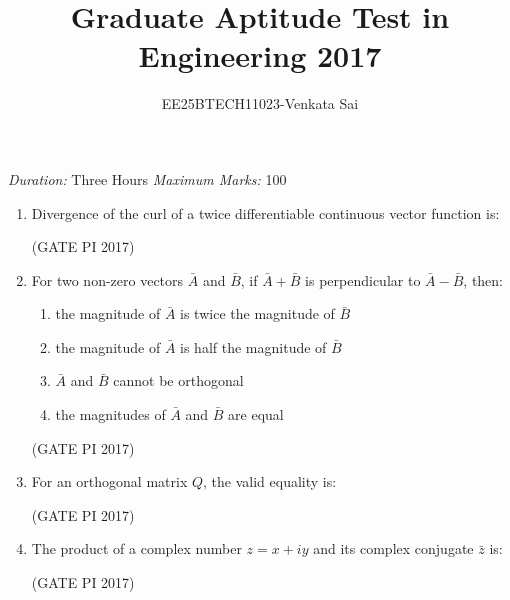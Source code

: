 \documentclass[journal,12pt,onecolumn]{IEEEtran}
\title{Graduate Aptitude Test in Engineering 2017}
\author{EE25BTECH11023-Venkata Sai}
\theoremstyle{remark}
\begin{document}
\noindent
\maketitle
\textit{Duration:} Three Hours \hfill \textit{Maximum Marks:} 100

\begin{enumerate}

\item Divergence of the curl of a twice differentiable continuous vector function is:
\begin{enumerate}
\end{enumerate}
\hfill (GATE PI 2017)

\item For two non-zero vectors $\bar{A}$ and $\bar{B}$, if $\bar{A} + \bar{B}$ is perpendicular to $\bar{A} - \bar{B}$, then:
\begin{enumerate}
\item the magnitude of $\bar{A}$ is twice the magnitude of $\bar{B}$
\item the magnitude of $\bar{A}$ is half the magnitude of $\bar{B}$
\item $\bar{A}$ and $\bar{B}$ cannot be orthogonal
\item the magnitudes of $\bar{A}$ and $\bar{B}$ are equal
\end{enumerate}
\hfill (GATE PI 2017)

\item For an orthogonal matrix $Q$, the valid equality is:
\begin{enumerate}
\end{enumerate}
\hfill (GATE PI 2017)

\item The product of a complex number $z = x + i y$ and its complex conjugate $\bar{z}$ is:
\begin{enumerate}
\end{enumerate}
\hfill (GATE PI 2017)


\end{enumerate}
\end{document}
